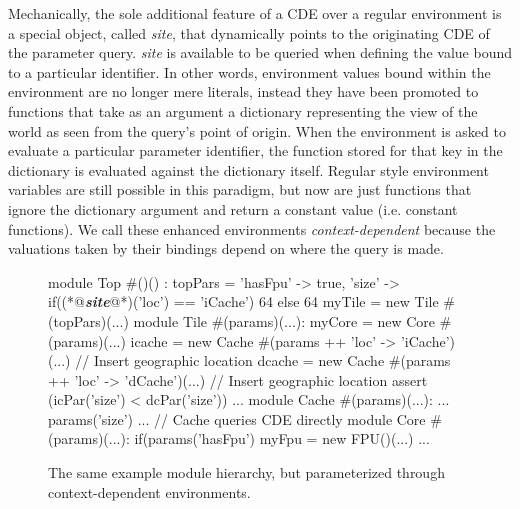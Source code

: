 Mechanically, the sole additional feature of a CDE over a regular environment is a special object, called \emph{site}, that dynamically points to the originating CDE of the parameter query.
\emph{site} is available to be queried when defining the value bound to a particular identifier.
In other words, environment values bound within the environment are no longer mere literals, instead
they have been promoted to functions that take as an argument a dictionary representing the view of the world as seen from the query's point of origin.
When the environment is asked to evaluate a particular parameter identifier, the function stored for that key in the dictionary is evaluated against the dictionary itself.
Regular style environment variables are still possible in this paradigm, but now are just functions that ignore the dictionary argument and return a constant value (i.e. constant functions). 
We call these enhanced environments {\em context-dependent} because the valuations taken by their bindings depend on where the query is made.

\begin{figure}[p]
\centering
\begin{phdl}
module Top #()() :
  topPars = {'hasFpu' -> true,
             'size' -> if((*@\textcolor[rgb]{1,0.5,0}{\textbf{\textit{site}}}@*)('loc') == 'iCache') 64 else 64 }
  myTile = new Tile #(topPars)(...)
module Tile #(params)(...):
  myCore = new Core #(params)(...)
  icache = new Cache #(params ++ {'loc' -> 'iCache'})(...) // Insert geographic location
  dcache = new Cache #(params ++ {'loc' -> 'dCache'})(...) // Insert geographic location
  assert (icPar('size') < dcPar('size')) ...
module Cache #(params)(...):
  ... params('size') ... // Cache queries CDE directly
module Core #(params)(...):
  if(params('hasFpu') myFpu = new FPU()(...) ...
\end{phdl} 
\caption{The same example module hierarchy, but parameterized through context-dependent environments.}
\label{fig:cde}
\end{figure}

